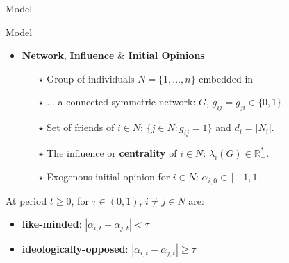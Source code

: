 \documentclass[xcolor=table,handout]{beamer}
\begin{document}
\begin{frame}
\begin{tcolorbox}[enhanced,attach boxed title to top center={yshift=-3mm,yshifttext=-1mm}, colback=red!3,colframe=red!40,colbacktitle=red!40 ,fonttitle=\bfseries, boxed title style={size=small,colframe=red!50} ] 
\centering Model
\end{tcolorbox}
\end{frame}

\begin{frame}{Model}
\begin{itemize}\setlength\itemsep{1em}
	\item {\bf\color{purple}Network}, {\bf\color{purple}Influence} \& {\bf\color{purple}Initial Opinions} 
	\begin{itemize}\setlength\itemsep{1em}
		\item[$\star$] Group of individuals $N = \{ 1, \ldots, n\}$ embedded in
		\item[$\star$] ... a connected symmetric network: $G$, $g_{ij} = g_{ji} \in \{ 0,1\}$.
		\item[$\star$] Set of friends of $i \in N$: $\{ j \in N: g_{ij} =1 \}$ and $d_i = |N_i|$. 
		\item[$\star$] The influence or {\bf\color{purple}centrality} of $i \in N$: $\lambda_i (G) \in \mathbb{R}_{+}^{*}$.
		\item[$\star$] Exogenous initial opinion for $i \in N$: $\alpha_{i,0} \in [-1,1]$
		
	\end{itemize}
	\end{itemize}
	\begin{tcolorbox}[enhanced,attach boxed title to top center={yshift=-3mm,yshifttext=-1mm}, colback=red!3,colframe=red!40,colbacktitle=red!40 ,fonttitle=\bfseries, boxed title style={size=small,colframe=red!50}, title ={Definition} ]  At period $t \geq 0$, for $\tau \in (0,1)$, $i \neq j \in N$ are:
	\begin{itemize}
		\item {\bf\color{purple} like-minded}: $|\alpha_{i,t} - \alpha_{j,t}| < \tau$
		\item {\bf\color{purple} ideologically-opposed}: $|\alpha_{i,t} - \alpha_{j,t}| \geq \tau$
	\end{itemize}
	\end{tcolorbox}

\end{frame}
%
\end{document}
